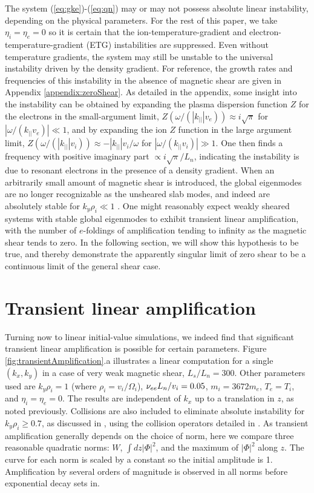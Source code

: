 \documentclass{jpp}
\let\ge=\geqslant  \let\geq=\geqslant
\begin{document}
The system (\ref{eq:gke})-(\ref{eq:qn}) may or may not possess absolute linear instability,
depending on the physical parameters.
For the rest of this paper, we take $\eta_i = \eta_e = 0$
so it is certain that the ion-temperature-gradient and electron-temperature-gradient (ETG)
instabilities are suppressed.
Even without temperature gradients, the system may still be unstable to the universal instability
driven by the density gradient.
For reference, the growth rates and frequencies of this instability
in the absence of magnetic shear are given in Appendix \ref{appendix:zeroShear}.
As detailed in the appendix, some insight into the instability can be obtained by expanding
the plasma dispersion function $Z$ for the electrons in the small-argument limit,
$Z(\omega / (|k_{||}| v_e)) \approx i \sqrt{\pi}$ for $|\omega / (k_{||} v_e)| \ll 1$,
and by expanding the ion $Z$ function in the large argument limit,
$Z(\omega / (|k_{||}| v_i)) \approx - |k_{||}| v_i / \omega$ for $|\omega / (k_{||} v_i)| \gg 1$.
One then finds a frequency with positive imaginary part $\propto i \sqrt{\pi} / L_n$,
indicating the instability is due to resonant electrons in the presence of a density gradient.
When an arbitrarily small amount of magnetic shear is introduced, the global eigenmodes are
no longer recognizable as the unsheared slab modes, and indeed are absolutely stable
for $k_y\rho_i \ll 1$ \citep{Ross,Tsang}.  One might reasonably expect weakly sheared systems with
stable global eigenmodes to exhibit transient linear amplification, with the number of $e$-foldings
of amplification tending to infinity as the magnetic shear tends to zero.  In the following section,
we will show this hypothesis to be true, and thereby demonstrate the apparently singular limit of zero shear
to be a continuous limit of the general shear case.


\section{Transient linear amplification}
\label{sec:transient}

Turning now to linear initial-value simulations,
we indeed find that significant transient linear amplification is possible for certain parameters.
Figure \ref{fig:transientAmplification}.a illustrates
a linear computation for a single $(k_x,k_y)$ in a case of very weak magnetic shear, $L_s / L_n = 300$.
Other parameters used are $k_y \rho_i = 1$ (where  $\rho_i = v_i / \Omega_i$), $\nu_{ee} L_n / v_i = 0.05$,
$m_i = 3672 m_e$,
$T_e = T_i$, and $\eta_i = \eta_e = 0$.
The results are independent of $k_x$ up to a translation in $z$, as noted previously.
Collisions are also included to eliminate absolute instability for $k_y \rho_i \ge 0.7$,
as discussed in \citet{usUniversalInstability},
using the collision operators detailed in \citet{Abel}.
As transient amplification generally depends on the choice
of norm, here we compare three reasonable quadratic norms: $W$, $\int dz |\Phi|^2$,
and the maximum of $|\Phi|^2$ along $z$.
The curve for each norm is scaled by a constant so the initial amplitude is 1.
Amplification by several orders of magnitude is observed in all norms
before exponential decay sets in.
\end{document}
